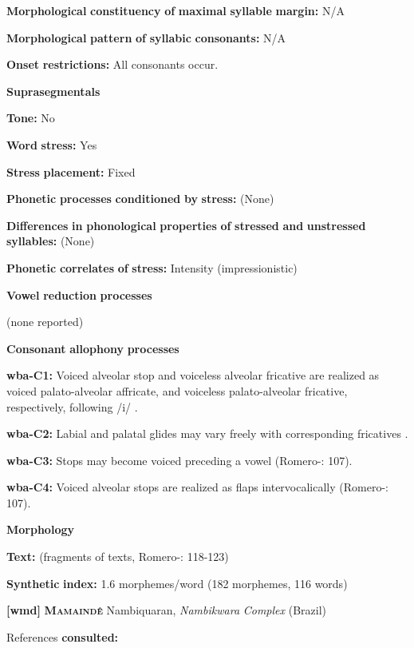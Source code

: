 \begin{styleBody}
\textbf{Morphological} \textbf{constituency} \textbf{of} \textbf{maximal} \textbf{syllable} \textbf{margin:} N/A

\textbf{Morphological} \textbf{pattern} \textbf{of} \textbf{syllabic} \textbf{consonants:} N/A

\textbf{Onset} \textbf{restrictions:} All consonants occur.

\textbf{Suprasegmentals}

\textbf{Tone:} No

\textbf{Word} \textbf{stress:} Yes

\textbf{Stress} \textbf{placement:} Fixed

\textbf{Phonetic} \textbf{processes} \textbf{conditioned} \textbf{by} \textbf{stress:} (None)

\textbf{Differences} \textbf{in} \textbf{phonological} \textbf{properties} \textbf{of} \textbf{stressed} \textbf{and} \textbf{unstressed} \textbf{syllables:} (None)

\textbf{Phonetic} \textbf{correlates} \textbf{of} \textbf{stress:} Intensity (impressionistic)

\textbf{Vowel} \textbf{reduction} \textbf{processes}

(none reported)

\textbf{Consonant} \textbf{allophony} \textbf{processes}

\textbf{wba-C1:} Voiced alveolar stop and voiceless alveolar fricative are realized as voiced palato-alveolar affricate, and voiceless palato-alveolar fricative, respectively, following /i/ \citep[121]{Arinterol2000}.

\textbf{wba-C2:} Labial and palatal glides may vary freely with corresponding fricatives \citep[122]{Arinterol2000}.

\textbf{wba-C3:} Stops may become voiced preceding a vowel (Romero-\citealt{Figeroa1997}: 107).

\textbf{wba-C4:} Voiced alveolar stops are realized as flaps intervocalically (Romero-\citealt{Figeroa1997}: 107).

\textbf{Morphology}

\textbf{Text:} (fragments of texts, Romero-\citealt{Figeroa1997}: 118-123)

\textbf{Synthetic} \textbf{index:} 1.6 morphemes/word (182 morphemes, 116 words)

\textbf{[wmd]} \textbf{\textsc{Mamaindê}}  Nambiquaran, \textit{Nambikwara} \textit{Complex} (Brazil)

References \textbf{consulted:} \citet{Eberhard2009}


\end{styleBody}
